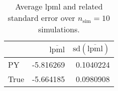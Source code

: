 \begin{table}[H]

\caption{Average lpml and related standard error over $n_{\text{sim}} = 10$ simulations.}
\centering
\begin{tabular}[t]{lrr}
\toprule
  & $\overbar{\text{lpml}}$ & $\text{sd}(\overbar{\text{lpml}})$\\
\midrule
PY & -5.816269 & 0.1040224\\
True & -5.664185 & 0.0980908\\
\bottomrule
\end{tabular}
\end{table}